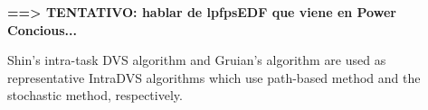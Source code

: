 \documentclass[10pt,article]{IEEEtran}
\begin{document}
\textbf{==> TENTATIVO: hablar de lpfpsEDF que viene en Power Concious...}

Shin's intra-task DVS algorithm \cite{shin-kim-lee} and Gruian's algorithm \cite{gruian} are used as representative IntraDVS algorithms which use path-based method and the stochastic method, respectively.



%
\end{document}
